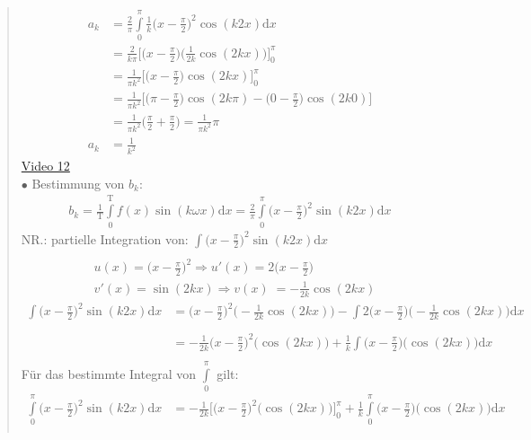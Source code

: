 \begin{quote}
\begin{align*}
a_k&=\frac{2}{\pi}\int\limits_{0}^{\pi}\frac{1}{k} \bigg(x-\frac{\pi}{2}\bigg)^2\cos(k2x)\mathrm{d}x\\
&=\frac{2}{k\pi}\bigg[\bigg(x-\frac{\pi}{2}\bigg)\bigg(\frac{1}{2k}\cos(2kx)\bigg)\bigg]^\pi_0\\
&=\frac{1}{\pi k^2}\bigg[\bigg(x-\frac{\pi}{2}\bigg)\cos(2kx)\bigg]^\pi_0\\&=\frac{1}{\pi k^2}\bigg[\bigg(\pi-\frac{\pi}{2}\bigg)\cos(2k\pi)-\bigg(0-\frac{\pi}{2}\bigg)\cos(2k 0)\bigg]\\
&=\frac{1}{\pi k^2}\bigg(\frac{\pi}{2}+\frac{\pi}{2}\bigg)=\frac{1}{\pi k^2}\pi\\
a_k&=\frac{1}{k^2}
\end{align*}
\href{https://youtu.be/3sByNrjJVc0}{Video 12}\\
$\bullet$ \;\; Bestimmung von $b_k$:\\
\begin{align*}
b_k=\frac{1}{\mathrm{T}}\int\limits_{0}^{\mathrm{T}}f(x) \sin(k\omega x)\mathrm{d}x=\frac{2}{\pi}\int\limits_{0}^{\pi} \bigg(x-\frac{\pi}{2}\bigg)^2\sin(k2x)\mathrm{d}x
\end{align*}
NR.: partielle Integration von: $\int\limits_{}^{} \big(x-\frac{\pi}{2}\big)^2\sin(k2x)\mathrm{d}x  $\\
\begin{align*}
&u(x)=\bigg(x-\frac{\pi}{2}\bigg)^2\Rightarrow u'(x)=2\bigg(x-\frac{\pi}{2}\bigg)\\
&v'(x)=\sin(2kx)\Rightarrow v(x)\;=-\frac{1}{2k}\cos(2kx)
\end{align*}
\begin{align*}
\int\limits_{}^{} \bigg(x-\frac{\pi}{2}\bigg)^2\sin(k2x)\mathrm{d}x&=\bigg(x-\frac{\pi}{2}\bigg)^2\bigg(-\frac{1}{2k}\cos(2kx)\bigg)-\int\limits_{}^{} 2\bigg(x-\frac{\pi}{2}\bigg)\bigg(-\frac{1}{2k}\cos(2kx)\bigg)\mathrm{d}x\\
&=-\frac{1}{2k}\bigg(x-\frac{\pi}{2}\bigg)^2\bigg(\cos(2kx)\bigg)+\frac{1}{k}\int\limits_{}^{} \bigg(x-\frac{\pi}{2}\bigg)\bigg(\cos(2kx)\bigg)\mathrm{d}x
\end{align*}
Für das bestimmte Integral von $ \int\limits_{0}^{\pi}  $ gilt:\\
\begin{align*}
\int\limits_{0}^{\pi}\bigg(x-\frac{\pi}{2}\bigg)^2\sin(k2x)\mathrm{d}x&=-\frac{1}{2k}\bigg[\bigg(x-\frac{\pi}{2}\bigg)^2\bigg(\cos(2kx)\bigg)\bigg]^\pi_0+\frac{1}{k}\int\limits_{0}^{\pi} \bigg(x-\frac{\pi}{2}\bigg)\bigg(\cos(2kx)\bigg)\mathrm{d}x\\

\end{align*}
\end{quote}
